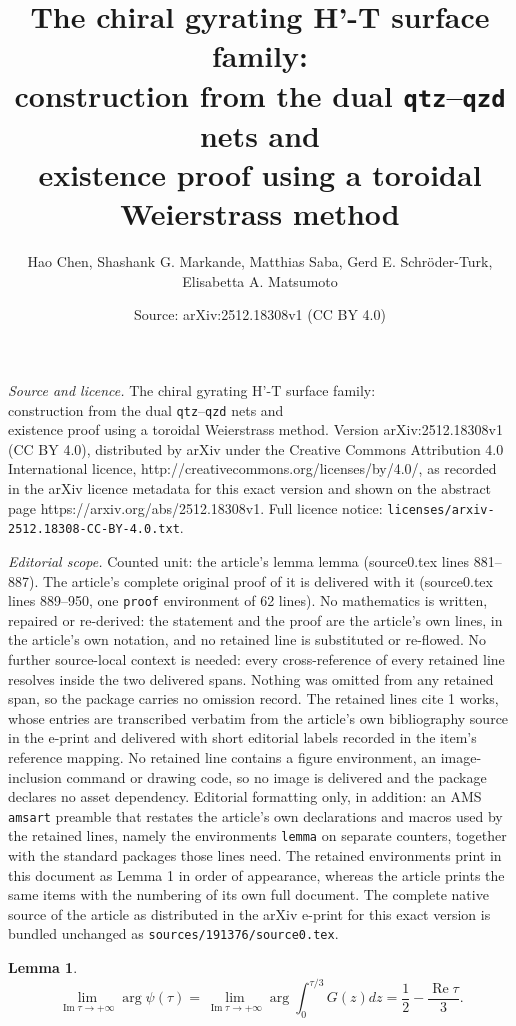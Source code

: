 \documentclass[10pt,a4paper]{amsart}
\title{The chiral gyrating H'-T surface family:\\ construction from the dual \texttt{qtz}--\texttt{qzd} nets and\\ existence proof using a toroidal Weierstrass method}
\author{Hao Chen, Shashank G. Markande, Matthias Saba, Gerd E. Schr\"oder-Turk, Elisabetta A. Matsumoto}
\date{Source: arXiv:2512.18308v1 (CC BY 4.0)}
\newtheorem{lemma}{Lemma}
\newcommand{\im}{\operatorname{Im}}
\newcommand{\re}{\operatorname{Re}}
\begin{document}
\maketitle

\noindent\emph{Source and licence.} The chiral gyrating H'-T surface family:\\ construction from the dual \texttt{qtz}--\texttt{qzd} nets and\\ existence proof using a toroidal Weierstrass method. Version arXiv:2512.18308v1 (CC BY 4.0), distributed by arXiv under the Creative Commons Attribution 4.0 International licence, http://creativecommons.org/licenses/by/4.0/, as recorded in the arXiv licence metadata for this exact version and shown on the abstract page https://arxiv.org/abs/2512.18308v1. Full licence notice: \texttt{licenses/arxiv-2512.18308-CC-BY-4.0.txt}.\par\smallskip

\noindent\textit{Editorial scope.} Counted unit: the article's lemma lemma (source0.tex lines 881--887). The article's complete original proof of it is delivered with it (source0.tex lines 889--950, one \texttt{proof} environment of 62 lines). No mathematics is written, repaired or re-derived: the statement and the proof are the article's own lines, in the article's own notation, and no retained line is substituted or re-flowed.  No further source-local context is needed: every cross-reference of every retained line resolves inside the two delivered spans.  Nothing was omitted from any retained span, so the package carries no omission record.  The retained lines cite 1 works, whose entries are transcribed verbatim from the article's own bibliography source in the e-print and delivered with short editorial labels recorded in the item's reference mapping.  No retained line contains a figure environment, an image-inclusion command or drawing code, so no image is delivered and the package declares no asset dependency.  Editorial formatting only, in addition: an AMS \texttt{amsart} preamble that restates the article's own declarations and macros used by the retained lines, namely the environments \texttt{lemma} on separate counters, together with the standard packages those lines need.  The retained environments print in this document as Lemma 1 in order of appearance, whereas the article prints the same items with the numbering of its own full document.  The complete native source of the article as distributed in the arXiv e-print for this exact version is bundled unchanged as \texttt{sources/191376/source0.tex}.
\begin{lemma}
	\[
		\lim_{\im\tau \to +\infty} \arg \psi(\tau)
		= \lim_{\im\tau \to +\infty} \arg \int_0^{\tau/3} G(z) dz
		= \frac{1}{2} - \frac{\re\tau}{3}.
	\]
\end{lemma}
\end{document}
